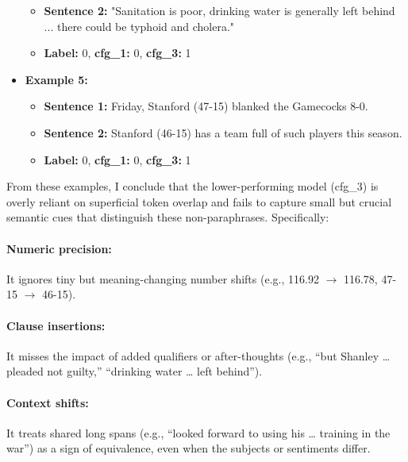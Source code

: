 \documentclass[12pt]{article}
\begin{document}
\begin{itemize}
\begin{itemize}
        \item \textbf{Sentence 2:} "Sanitation is poor, drinking water is generally left behind ... there could be typhoid and cholera."
        \item \textbf{Label:} 0, \textbf{cfg\_1:} 0, \textbf{cfg\_3:} 1
    \end{itemize}
    \item \textbf{Example 5:}
    \begin{itemize}
        \item \textbf{Sentence 1:} Friday, Stanford (47-15) blanked the Gamecocks 8-0.
        \item \textbf{Sentence 2:} Stanford (46-15) has a team full of such players this season.
        \item \textbf{Label:} 0, \textbf{cfg\_1:} 0, \textbf{cfg\_3:} 1
    \end{itemize}
\end{itemize}

From these examples, I conclude that the lower-performing model (cfg\_3) is overly reliant on superficial token overlap and fails to capture small but crucial semantic cues that distinguish these non-paraphrases. Specifically:

\paragraph{Numeric precision:} It ignores tiny but meaning-changing number shifts (e.g., 116.92 $\rightarrow$ 116.78, 47-15 $\rightarrow$ 46-15).
\paragraph{Clause insertions:} It misses the impact of added qualifiers or after-thoughts (e.g., “but Shanley … pleaded not guilty,” “drinking water … left behind”).
\paragraph{Context shifts:} It treats shared long spans (e.g., “looked forward to using his … training in the war”) as a sign of equivalence, even when the subjects or sentiments differ.
\end{document}

